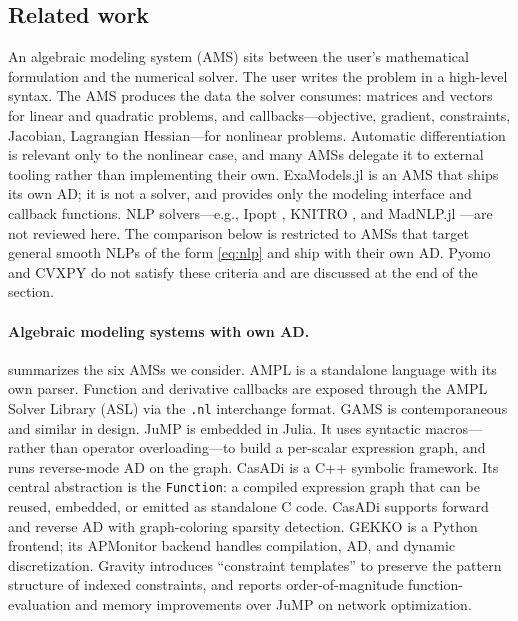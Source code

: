 \documentclass[11pt]{article}
\begin{document}
\subsection{Related work}
\label{sec:intro:related}

An algebraic modeling system (AMS) sits between the user's mathematical formulation and the numerical solver. The user writes the problem in a high-level syntax. The AMS produces the data the solver consumes: matrices and vectors for linear and quadratic problems, and callbacks---objective, gradient, constraints, Jacobian, Lagrangian Hessian---for nonlinear problems. Automatic differentiation is relevant only to the nonlinear case, and many AMSs delegate it to external tooling rather than implementing their own. ExaModels.jl is an AMS that ships its own AD; it is not a solver, and provides only the modeling interface and callback functions. NLP solvers---e.g., Ipopt \citep{wachterImplementationInteriorpointFilter2006}, KNITRO \citep{byrdKnitroIntegratedPackage2006}, and MadNLP.jl \citep{shinMadNLPjl2025}---are not reviewed here. The comparison below is restricted to AMSs that target general smooth NLPs of the form \cref{eq:nlp} and ship with their own AD. Pyomo and CVXPY do not satisfy these criteria and are discussed at the end of the section.

\paragraph{Algebraic modeling systems with own AD.}
 summarizes the six AMSs we consider. AMPL \citep{fourerModelingLanguageMathematical1990} is a standalone language with its own parser. Function and derivative callbacks are exposed through the AMPL Solver Library (ASL) via the \texttt{.nl} interchange format. GAMS \citep{bussieckGeneralAlgebraicModeling2004} is contemporaneous and similar in design. JuMP \citep{dunningJuMPModelingLanguage2017,lubinJuMP10Recent2023} is embedded in Julia. It uses syntactic macros---rather than operator overloading---to build a per-scalar expression graph, and runs reverse-mode AD on the graph. CasADi \citep{anderssonCasADiSoftwareFramework2019} is a C++ symbolic framework. Its central abstraction is the \texttt{Function}: a compiled expression graph that can be reused, embedded, or emitted as standalone C code. CasADi supports forward and reverse AD with graph-coloring sparsity detection. GEKKO \citep{bealGEKKOOptimizationSuite2018} is a Python frontend; its APMonitor backend handles compilation, AD, and dynamic discretization. Gravity \citep{hijaziGravityMathematicalModeling2018} introduces ``constraint templates'' to preserve the pattern structure of indexed constraints, and reports order-of-magnitude function-evaluation and memory improvements over JuMP on network optimization. 
\end{document}
